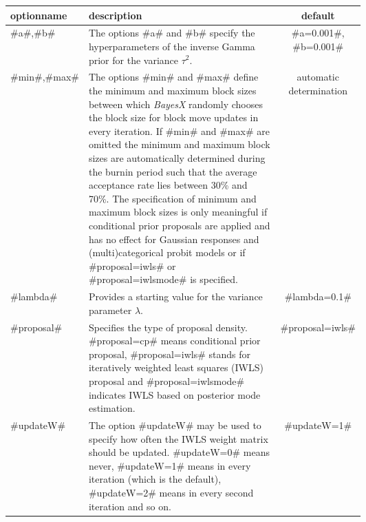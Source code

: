 \begin{table}[ht] \footnotesize \centering
\begin{tabular}{|l|p{0.6\linewidth}|c|}

\hline optionname & description & default\\ \hline\hline

#a#,#b# & The options #a# and #b# specify the hyperparameters of
the inverse Gamma prior for
the variance $\tau^2$. & #a=0.001#, #b=0.001# \\
\hline

#min#,#max# & The options #min# and #max# define the minimum and
maximum block sizes between which {\em BayesX} randomly chooses
the block size for block move updates in every iteration. If #min#
and #max# are omitted the minimum and maximum block sizes are
automatically determined during the burnin period such that the
average acceptance rate lies between 30\% and 70\%. The
specification of minimum and maximum block sizes is only
meaningful if conditional prior proposals are applied and has no
effect for Gaussian responses and
(multi)categorical probit models or if #proposal=iwls# or #proposal=iwlsmode# is specified. & automatic determination \\
\hline

#lambda# & Provides a starting value for the variance parameter $\lambda$. & #lambda=0.1# \\
\hline

#proposal# & Specifies the type of proposal density. #proposal=cp#
means conditional
 prior proposal, #proposal=iwls# stands for iteratively weighted least squares (IWLS)
 proposal and #proposal=iwlsmode# indicates IWLS based on posterior mode estimation. &
#proposal=iwls# \\ \hline

#updateW# & The option #updateW# may be used to specify how often
the IWLS weight matrix should be updated. #updateW=0# means never,
#updateW=1# means in every iteration (which is the default),
#updateW=2# means in every second iteration and so on. &
#updateW=1#
\\ \hline



\end{tabular}
\end{table}
